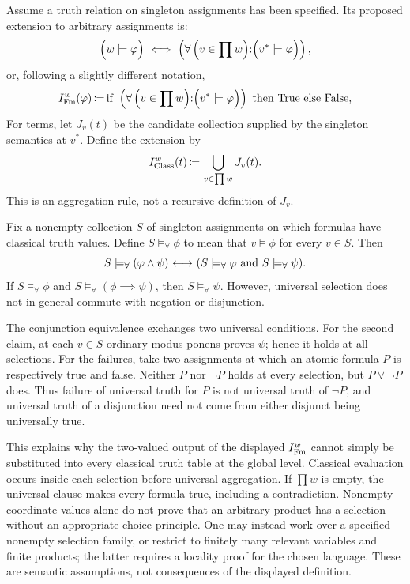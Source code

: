 Assume a truth relation on singleton assignments has been specified.
Its proposed extension to arbitrary assignments is:
\[
\left(w\models\varphi\vphantom\prod\right)\IFF
\left(\forall \left(v\in\prod w\middle):
\middle(v^*\models\varphi\right)\right),
\]
or, following a slightly different notation,
\[
I^w_\Fm(\varphi)\ceq 
\lif
\ \left(
\forall \left(v\in\prod w\middle):
\middle(v^*\models\varphi\right)
\right)
\ \lthen
\ \lTrue
\ \lelse
\ \lFalse,
\]
For terms, let $J_v(t)$ be the candidate collection supplied by the
singleton semantics at $v^*$. Define the extension by
\[
I^w_\Class(t)\ceq\bigcup_{v\in\prod w}J_v(t).
\]
This is an aggregation rule, not a recursive definition of $J_v$.


\begin{proposition}
Fix a nonempty collection $S$ of singleton assignments on which formulas
have classical truth values. Define $S\models_\forall\phi$ to mean that
$v\models\phi$ for every $v\in S$. Then
\[
S\models_\forall(\phi\land\psi)
\iff (S\models_\forall\phi\ \hbox{and}\ S\models_\forall\psi).
\]
If $S\models_\forall\phi$ and $S\models_\forall(\phi\implies\psi)$,
then $S\models_\forall\psi$. However, universal selection does not in
general commute with negation or disjunction.
\end{proposition}
\Proof
The conjunction equivalence exchanges two universal conditions.
For the second claim, at each $v\in S$ ordinary modus ponens proves
$\psi$; hence it holds at all selections. For the failures, take two
assignments at which an atomic formula $P$ is respectively true and
false. Neither $P$ nor $\neg P$ holds at every selection, but
$P\lor\neg P$ does. Thus failure of universal truth for $P$ is not
universal truth of $\neg P$, and universal truth of a disjunction need
not come from either disjunct being universally true.
\Done

This explains why the two-valued output of the displayed $I^w_\Fm$
cannot simply be substituted into every classical truth table at the
global level. Classical evaluation occurs inside each selection before
universal aggregation. If $\prod w$ is empty, the universal clause makes
every formula true, including a contradiction. Nonempty coordinate
values alone do not prove that an arbitrary product has a selection
without an appropriate choice principle. One may instead work over a
specified nonempty selection family, or restrict to finitely many
relevant variables and finite products; the latter requires a locality
proof for the chosen language. These are semantic assumptions, not
consequences of the displayed definition.

